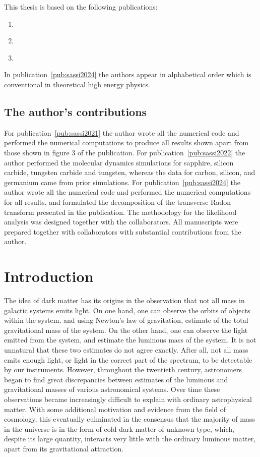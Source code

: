 This thesis is based on the following publications:
\begin{enumerate}[label = \Roman*, ref = \Roman*]
    \item\label{pub:sassi2021} 
    \item\label{pub:sassi2022} 
    \item\label{pub:sassi2024} 
\end{enumerate}
In publication~\ref{pub:sassi2024} the authors appear in alphabetical order which is conventional in theoretical high energy physics.

\section*{The author's contributions}

For publication~\ref{pub:sassi2021} the author wrote all the numerical code and performed the numerical computations to produce all results shown apart from those shown in figure 3 of the publication. For publication~\ref{pub:sassi2022} the author performed the molecular dynamics simulations for sapphire, silicon carbide, tungsten carbide and tungsten, whereas the data for carbon, silicon, and germanium came from prior simulations. For publication~\ref{pub:sassi2024} the author wrote all the numerical code and performed the numerical computations for all results, and formulated the decomposition of the transverse Radon transform presented in the publication. The methodology for the likelihood analysis was designed together with the collaborators. All manuscripts were prepared together with collaborators with substantial contributions from the author.

\cleardoublepage
\mainmatter

\chapter{Introduction}

The idea of dark matter has its origins in the observation that not all mass in galactic systems emits light. On one hand, one can observe the orbits of objects within the system, and using Newton's law of gravitation, estimate of the total gravitational mass of the system. On the other hand, one can observe the light emitted from the system, and estimate the luminous mass of the system. It is not unnatural that these two estimates do not agree exactly. After all, not all mass emits enough light, or light in the correct part of the spectrum, to be detectable by our instruments. However, throughout the twentieth century, astronomers began to find great discrepancies between estimates of the luminous and gravitational masses of various astronomical systems. Over time these observations became increasingly difficult to explain with ordinary astrophysical matter. With some additional motivation and evidence from the field of cosmology, this eventually culminated in the consensus that the majority of mass in the universe is in the form of cold dark matter of unknown type, which, despite its large quantity, interacts very little with the ordinary luminous matter, apart from its gravitational attraction.

